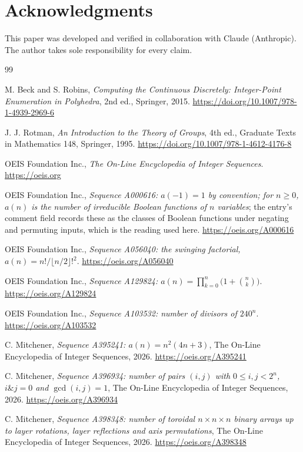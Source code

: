 \documentclass[11pt]{amsart}
\theoremstyle{definition}
\theoremstyle{remark}
\begin{document}
\section*{Acknowledgments}

This paper was developed and verified in collaboration with Claude (Anthropic). The author takes sole responsibility for every claim.

\begin{thebibliography}{99}

M. Beck and S. Robins, \emph{Computing the Continuous Discretely: Integer-Point Enumeration in Polyhedra}, 2nd ed., Springer, 2015. \url{https://doi.org/10.1007/978-1-4939-2969-6}

J. J. Rotman, \emph{An Introduction to the Theory of Groups}, 4th ed., Graduate Texts in Mathematics 148, Springer, 1995. \url{https://doi.org/10.1007/978-1-4612-4176-8}

OEIS Foundation Inc., \emph{The On-Line Encyclopedia of Integer Sequences}. \url{https://oeis.org}

OEIS Foundation Inc., \emph{Sequence A000616: $a(-1)=1$ by convention; for $n \ge 0$, $a(n)$ is the number of irreducible Boolean functions of $n$ variables}; the entry's comment field records these as the classes of Boolean functions under negating and permuting inputs, which is the reading used here. \url{https://oeis.org/A000616}

OEIS Foundation Inc., \emph{Sequence A056040: the swinging factorial, $a(n) = n!/\lfloor n/2\rfloor!^{2}$}. \url{https://oeis.org/A056040}

OEIS Foundation Inc., \emph{Sequence A129824: $a(n) = \prod_{k=0}^{n}\bigl(1+\binom{n}{k}\bigr)$}. \url{https://oeis.org/A129824}

OEIS Foundation Inc., \emph{Sequence A103532: number of divisors of $240^{n}$}. \url{https://oeis.org/A103532}

C. Mitchener, \emph{Sequence A395241: $a(n) = n^{2}(4n+3)$}, The On-Line Encyclopedia of Integer Sequences, 2026. \url{https://oeis.org/A395241}

C. Mitchener, \emph{Sequence A396934: number of pairs $(i,j)$ with $0 \le i,j < 2^{n}$, $i \mathbin{\&} j = 0$ and $\gcd(i,j)=1$}, The On-Line Encyclopedia of Integer Sequences, 2026. \url{https://oeis.org/A396934}

C. Mitchener, \emph{Sequence A398348: number of toroidal $n \times n \times n$ binary arrays up to layer rotations, layer reflections and axis permutations}, The On-Line Encyclopedia of Integer Sequences, 2026. \url{https://oeis.org/A398348}


\end{thebibliography}
\end{document}
